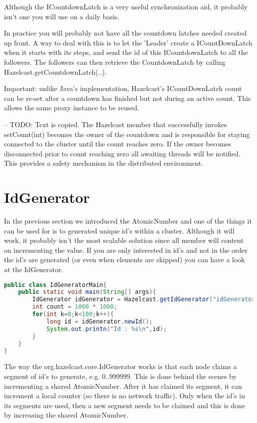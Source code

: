 Although the ICountdownLatch is a very useful synchronization aid, it probably isn't one
you will use on a daily basis.

In practice you will probably not have all the countdown latches needed created up front.
A way to deal with this is to let the 'Leader' create a ICountDownLatch when it starts with
its steps, and send the id of this ICountdownLatch to all the followers. The followers can 
then retrieve the CountdownLatch by calling Hazelcast.getCountdownLatch(..).

Important: unlike Java's implementation, Hazelcast's ICountDownLatch count can be re-set
after a countdown has finished but not during an active count. This allows the same
proxy instance to be reused.

-- TODO: Text is copied.
The Hazelcast member that successfully invokes setCount(int) becomes the owner of the countdown 
and is responsible for staying connected to the cluster until the count reaches zero. If the owner 
becomes disconnected prior to count reaching zero all awaiting threads will be notified. This provides 
a safety mechanism in the distributed environment.


\section{IdGenerator}

In the previous section we introduced the AtomicNumber and one of the things it
can be used for is to generated unique id's within a cluster. Although it will work,
it probably isn't the most scalable solution since all member will content on incrementing
the value. If you are only interested in id's and not in the order the id's are generated 
(or even when elements are skipped) you can have a look at the IdGenerator.

\begin{lstlisting}[language=java]
public class IdGeneratorMain{
    public static void main(String[] args){
        IdGenerator idGenerator = Hazelcast.getIdGenerator("idGenerator");
        int count = 1000 * 1000;
        for(int k=0;k<100;k++){
            long id = idGenerator.newId();
            System.out.printn("Id : %s\n",id);
        }
    }
}
\end{lstlisting}

The way the org.hazelcast.core.IdGenerator works is that each node claims a segment of 
id's to generate, e.g. 0..999999. This is done behind the scenes by incrementing a shared 
AtomicNumber. After it has claimed its segment, it can increment a local counter (so there is 
no network traffic). Only when the id's in its segments are used, then a new segment
needs to be claimed and this is done by increasing the shared AtomicNumber.

